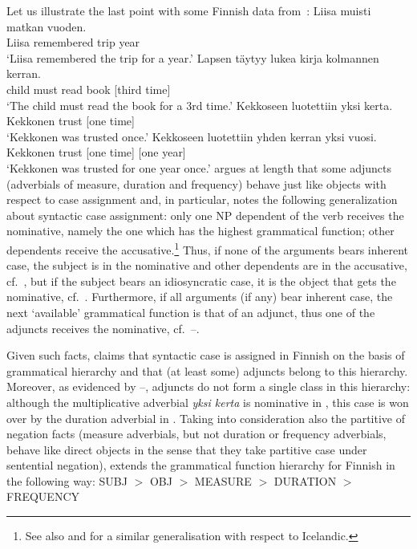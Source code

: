 \documentclass[output=paper]{langsci/langscibook}
\begin{document}
Let us illustrate the last point with some Finnish data from~\citealt{mali:93}:
\eal
\label{subj}
\ex \gll Liisa muisti matkan vuoden. \\
    Liisa\NOM{} remembered trip\ACC{} year\ACC{}\\
\glt  `Liisa remembered the trip for a year.'
\ex
\label{adv1bis}\label{obj}
\gll Lapsen t\"aytyy lukea kirja \phtm{[}kolmannen kerran. \\
    child\GEN{} must read book\NOM{} [third time]\ACC{}\\
\glt  `The child must read the book for a 3rd time.'
\ex
\label{adv1}
\gll Kekkoseen luotettiin \phtm{[}yksi kerta. \\
    Kekkonen\Ill{} trust\PassP{} [one time]\NOM{}\\
\glt `Kekkonen was trusted once.'
\ex
\label{adv2}
\gll Kekkoseen luotettiin \phtm{[}yhden kerran \phtm{[}yksi vuosi. \\
    Kekkonen\Ill{} trust\PassP{} [one time]\ACC{} [one year]\NOM{}\\
\glt  `Kekkonen was trusted for one year once.'
\zl
\citet{mali:93} argues at length that some adjuncts (adverbials of measure,
duration and frequency) behave just like objects with respect to case
assignment and, in particular, notes the following generalization about
syntactic case assignment: only one NP dependent of the verb receives the
nominative, namely the one which has the highest grammatical function;
other dependents receive the accusative.\footnote{See also
  \citealt{zae:mal:83} and \citealt{ZMT85a} for a similar generalisation with respect to
  Icelandic.}  Thus, if none of the arguments bears inherent case, the
subject is in the nominative and other dependents are in the accusative, cf.~, but if the subject bears an idiosyncratic case, it is the
object that gets the nominative, cf.~.  Furthermore, if all arguments
(if any) bear inherent case, the next `available’ grammatical function is
that of an adjunct, thus one of the adjuncts receives the nominative, 
cf.~–.

Given such facts,
\citet{mali:93} claims that syntactic case is assigned in Finnish on
the basis of grammatical hierarchy and that (at least some) adjuncts
belong to this hierarchy.  Moreover, as evidenced by
–, adjuncts do not form a single class in this
hierarchy: although the multiplicative adverbial \emph{yksi kerta} is
nominative in , this case is won over by the duration
adverbial in . Taking into consideration also the partitive
of negation facts (measure adverbials, but not duration or frequency
adverbials, behave like direct objects in the sense that they take
partitive case under sentential negation), \citet{mali:93} extends the
grammatical function hierarchy for Finnish in the following way:
\ea
SUBJ $>$ OBJ $>$ MEASURE $>$ DURATION $>$ FREQUENCY
\z
\end{document}
